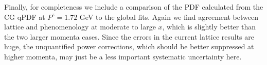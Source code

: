 \documentclass[prd,twocolumn,preprintnumbers,showpacs,nofootinbib,superscriptaddress,notitlepage,floatfix]{revtex4-1}
\begin{document}
Finally, for completeness we include a comparison of the PDF calculated from the CG qPDF at $P^z=1.72$ GeV to the global fits. Again we find agreement between lattice and phenomenology at moderate to large $x$, which is slightly better than the two larger momenta cases. Since the errors in the current lattice results are huge, the unquantified power corrections, which should be better suppressed at higher momenta, may just be a less important systematic uncertainty here.

\newpage


\end{document}

